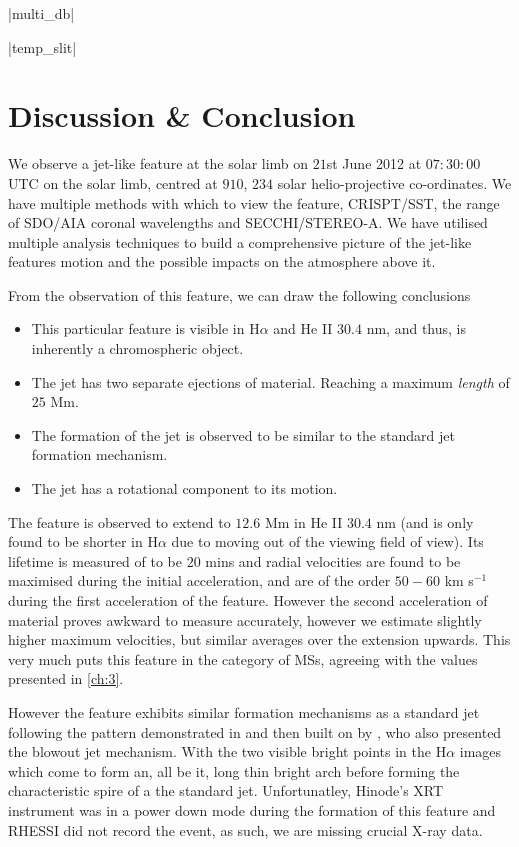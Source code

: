 \py[chapter5]|multi_db|

\py[chapter5]|temp_slit|

\section{Discussion \& Conclusion}
\label{sec:DandC}

We observe a jet-like feature at the solar limb on $21$st June 2012 at $07:30:00$ UTC on the solar limb, centred at $910$, $234$ solar helio-projective co-ordinates.
We have multiple methods with which to view the feature, CRISPT/SST, the range of SDO/AIA coronal wavelengths and SECCHI/STEREO-A.
We have utilised multiple analysis techniques to build a comprehensive picture of the jet-like features motion and the possible impacts on the atmosphere above it.

From the observation of this feature, we can draw the following conclusions
\begin{itemize}
	\item{This particular feature is visible in H$\alpha$ and He II $30.4$ nm, and thus, is inherently a chromospheric object.}
	\item{The jet has two separate ejections of material. Reaching a maximum \emph{length} of $25$ Mm.}
	\item{The formation of the jet is observed to be similar to the standard jet formation mechanism.}
	\item{The jet has a rotational component to its motion.}
\end{itemize}

The feature is observed to extend to $12.6$ Mm in He II $30.4$ nm (and is only found to be shorter in H$\alpha$ due to moving out of the viewing field of view).
Its lifetime is measured of to be $20$ mins and radial velocities are found to be maximised during the initial acceleration, and are of the order $50 - 60$ km s$^{-1}$ during the first acceleration of the feature.
However the second acceleration of material proves awkward to measure accurately, however we estimate slightly higher maximum velocities, but similar averages over the extension upwards. 
This very much puts this feature in the category of MSs, agreeing with the values presented in \cref{ch:3}.

However the feature exhibits similar formation mechanisms as a standard jet following the pattern demonstrated in \cite{Shibata1992} and then built on by \cite{Moore2010}, who also presented the blowout jet mechanism.
With the two visible bright points in the H$\alpha$ images which come to form an, all be it, long thin bright arch before forming the characteristic spire of a the standard jet.
Unfortunatley, Hinode's XRT instrument was in a power down mode during the formation of this feature and RHESSI did not record the event, as such, we are missing crucial X-ray data.

